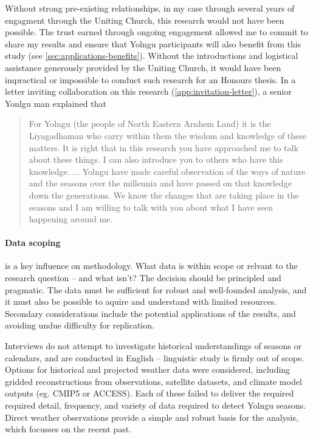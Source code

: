 Without strong pre-existing relationships, in my case through several
years of engagment through the Uniting Church, this research would not
have been possible.  The trust earned through ongoing engagement allowed
me to commit to share my results and ensure that Yolngu participants will
also benefit from this study (see \cref{sec:applications-benefits}).  Without the introductions and logistical
assistance generously provided by the Uniting Church, it would have been impractical or
impossible to conduct such research for an Honours thesis.
%
In a letter inviting collaboration on this research (\cref{app:invitation-letter}),
a senior Yonlgu man explained that
\begin{quote} %
    For Yolngu (the people of North Eastern Arnhem Land) it is the Liyagadhaman
    who carry within them the wisdom and knowledge of these matters.
    It is right that in this research you have approached me to talk about these
    things. I can also introduce you to others who have this knowledge.
    ...
    Yolngu have made careful observation of the ways of nature and the seasons
    over the millennia and have passed on that knowledge down the generations.
    We know the changes that are taking place in the seasons and I am willing
    to talk with you about what I have seen happening around me.
\end{quote}


\paragraph{Data scoping} is a key influence on methodology.
What data is within scope or relvant to the research question --
and what isn't?
%
The decision should be principled and pragmatic.
The data must be sufficient for robust and well-founded analysis,
and it must also be possible to aquire and understand with limited
resources.  Secondary considerations include the potential applications
of the results, and avoiding undue difficulty for replication.

Interviews do not attempt to investigate historical understandings of
seasons or calendars, and are conducted in English -- linguistic study
is firmly out of scope.
%
Options for historical and projected weather data were considered, including
gridded reconstructions from observations, satellite datasets, and climate
model outputs (eg. CMIP5 or ACCESS).  Each of these failed to deliver the
required required detail, frequency, and variety of data required to detect
Yolngu seasons.  Direct weather observations provide a simple and robust basis
for the analysis, which focusses on the recent past.

